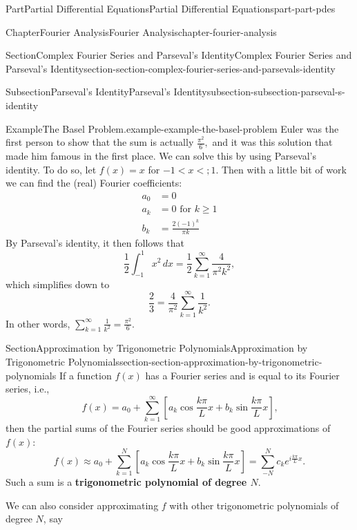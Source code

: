 \documentclass[twoside,10pt,]{book}
\newcommand{\terminology}[1]{\textbf{#1}}
\numberwithin{equation}{part}
\newcommand{\lt}{<}
\newcommand{\amp}{&}
\begin{document}
\begin{partptx}{Part}{Partial Differential Equations}{}{Partial Differential Equations}{}{}{part-part-pdes}
\begin{chapterptx}{Chapter}{Fourier Analysis}{}{Fourier Analysis}{}{}{chapter-fourier-analysis}
\begin{sectionptx}{Section}{Complex Fourier Series and Parseval's Identity}{}{Complex Fourier Series and Parseval's Identity}{}{}{section-section-complex-fourier-series-and-parsevals-identity}
\begin{subsectionptx}{Subsection}{Parseval's Identity}{}{Parseval's Identity}{}{}{subsection-subsection-parseval-s-identity}
\begin{example}{Example}{The Basel Problem.}{example-example-the-basel-problem}
Euler was the first person to show that the sum is actually \(\frac{\pi^{2}}{6},\) and it was this solution that made him famous\footnotemark{} in the first place. We can solve this by using Parseval's identity. To do so, let \(f(x) = x\) for \(-1 \lt x \lt; 1\). Then with a little bit of work we can find the (real) Fourier coefficients:%
\begin{align*}
a_{0} \amp = 0 \\
a_{k} \amp = 0 \text{ for } k\geq 1 \\
b_{k} \amp = \frac{2(-1)^{k}}{\pi k} 
\end{align*}
By Parseval's identity, it then follows that%
\begin{equation*}
\frac{1}{2}\int_{-1}^{1}x^{2}\,dx = \frac{1}{2}\sum_{k=1}^{\infty}\frac{4}{\pi^{2}k^{2}},
\end{equation*}
which simplifies down to%
\begin{equation*}
\frac{2}{3} = \frac{4}{\pi^{2}}\sum_{k=1}^{\infty}\frac{1}{k^{2}}.
\end{equation*}
In other words, \(\sum_{k=1}^{\infty}\frac{1}{k^{2}} = \frac{\pi^{2}}{6}.\)%
\end{example}
%
\end{subsectionptx}
\end{sectionptx}
%
%
\typeout{************************************************}
\typeout{************************************************}
%
\begin{sectionptx}{Section}{Approximation by Trigonometric Polynomials}{}{Approximation by Trigonometric Polynomials}{}{}{section-section-approximation-by-trigonometric-polynomials}
If a function \(f(x)\) has a Fourier series and is equal to its Fourier series, i.e.,%
\begin{equation*}
f(x) = a_{0} + \sum_{k=1}^{\infty}[a_{k}\cos\frac{k\pi}{L}x + b_{k}\sin\frac{k\pi}{L}x]\text{,}
\end{equation*}
then the partial sums of the Fourier series should be good approximations of \(f(x)\):%
\begin{equation*}
f(x) \approx a_{0} + \sum_{k=1}^{N}[a_{k}\cos\frac{k\pi}{L}x + b_{k}\sin\frac{k\pi}{L}x] = \sum_{-N}^{N}c_{k}e^{i\frac{k\pi}{L}x}\text{.}
\end{equation*}
Such a sum is a \terminology{trigonometric polynomial of degree \(N\)}.%
\par
We can also consider approximating \(f\) with other trigonometric polynomials of degree \(N\), say%

\end{sectionptx}
\end{chapterptx}
\end{partptx}
\end{document}
